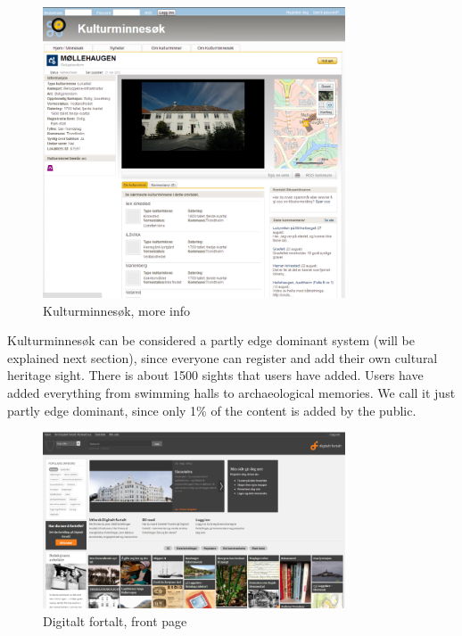 \documentclass[11pt]{book}
\begin{document}
\begin{figure}[H]
      \centering
      \includegraphics[width=0.8\textwidth]{Figures/Prestudy/kulturminnesokMoreInfo.png}
      \caption{Kulturminnesøk, more info}
      \label{fig:pre_kulturMoreInfo}
\end{figure}

Kulturminnesøk can be considered a partly edge dominant system (will be explained next section), since everyone can register and add their own cultural heritage sight. There is about 1500 sights that users have added. Users have added everything from swimming halls to archaeological memories. We call it just partly edge dominant, since only 1\% of the content is added by the public.

\begin{figure}[H]
      \centering
      \includegraphics[width=0.8\textwidth]{Figures/Prestudy/digitaltfortaltForside.png}
      \caption{Digitalt fortalt, front page}
      \label{fig:pre_fortaltFrontPage}
\end{figure}
\end{document}
